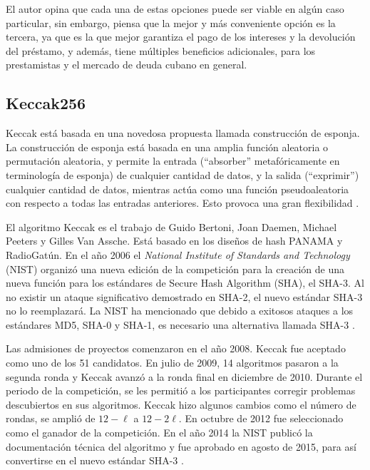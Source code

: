       El autor opina que cada una de estas opciones puede ser viable en algún caso particular, sin embargo, piensa que la mejor y más 
      conveniente opción 
      es la tercera, ya que es la que mejor garantiza el pago de los intereses y la devolución del préstamo, y además, tiene múltiples
      beneficios adicionales, para los prestamistas y el mercado de deuda cubano en general.

    \subsection{Keccak256}
      Keccak está basada en una novedosa propuesta llamada construcción de esponja. La construcción de esponja está basada en una amplia
      función aleatoria o permutación aleatoria, y permite la entrada (“absorber” metafóricamente en terminología de esponja) de cualquier 
      cantidad de datos,
      y la salida (“exprimir”) cualquier cantidad de datos, mientras actúa como una función pseudoaleatoria con respecto a todas las entradas
      anteriores. Esto provoca una gran flexibilidad \parencite{bertoni2007}.

      El algoritmo Keccak es el trabajo de Guido Bertoni, Joan Daemen, Michael Peeters y Gilles Van Assche. Está basado en los diseños de 
      hash PANAMA y RadioGatún. En el año 2006 el \textit{National Institute of Standards and Technology} (NIST) organizó una nueva edición de la competición para la creación de una nueva función 
      para los estándares de Secure Hash Algorithm (SHA), el SHA-3. Al no existir un ataque significativo demostrado en SHA-2, el nuevo 
      estándar SHA-3 no lo reemplazará. La NIST ha mencionado que debido a exitosos ataques a los estándares MD5, SHA-0 y SHA-1, es 
      necesario una alternativa llamada SHA-3 \parencite{stevens2017}.

      Las admisiones de proyectos comenzaron en el año 2008. Keccak fue aceptado como uno de los 51 candidatos. En julio de 2009, 14 
      algoritmos pasaron a la segunda ronda y Keccak avanzó a la ronda final en diciembre de 2010. Durante el periodo de la competición, se 
      les permitió a los participantes corregir problemas descubiertos en sus algoritmos. Keccak hizo algunos cambios como el número de 
      rondas, se amplió de ${\displaystyle 12-\ell}$ a ${\displaystyle 12-2\ell }$. En 
      octubre de 2012 fue seleccionado como el ganador de la competición. En el año 2014 la NIST publicó la documentación técnica del 
      algoritmo y fue aprobado en agosto de 2015, para así convertirse en el nuevo estándar SHA-3 \parencite{nist2015}.

